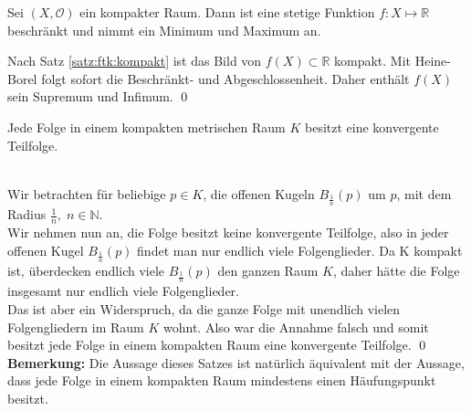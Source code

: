 \begin{Satz}
	Sei \((X, \mathcal{O})\) ein kompakter Raum. Dann ist eine stetige Funktion \(f: X \mapsto \mathbb{R}\) 
	beschränkt und nimmt ein Minimum und Maximum an.
\end{Satz}
%
	Nach Satz \ref{satz:ftk:kompakt} ist das Bild von \( f(X) \subset \mathbb{R} \) kompakt. Mit Heine-Borel 
	folgt sofort die Beschränkt- und Abgeschlossenheit. Daher enthält \(f(X)\) sein Supremum und Infimum.
\qed
	\begin{Satz}
		Jede Folge in einem kompakten metrischen Raum \(K\) besitzt eine konvergente Teilfolge.
	\end{Satz}
	\\
		Wir betrachten für beliebige \( p \in K \), die offenen Kugeln \( B_{\frac{1}{n}}(p) \) um \(p \), mit dem Radius \( \frac{1}{n},\; n \in \mathbb{N}\). \\
		Wir nehmen nun an, die Folge besitzt keine konvergente Teilfolge, also in jeder offenen Kugel \( B_{\frac{1}{n}}(p) \) findet man nur endlich viele Folgenglieder. 
		Da K kompakt ist, überdecken endlich viele  \( B_{\frac{1}{n}}(p) \) den ganzen Raum \( K \), daher hätte die Folge insgesamt nur endlich viele Folgenglieder.\\
		Das ist aber ein Widerspruch, da die ganze Folge mit unendlich vielen Folgengliedern im Raum \(K \) wohnt. Also war die Annahme falsch und somit besitzt jede Folge in einem kompakten
		Raum eine konvergente Teilfolge.
	\qed\\
	{\bf Bemerkung:} Die Aussage dieses Satzes ist natürlich äquivalent mit der Aussage, dass jede Folge in einem kompakten Raum mindestens einen Häufungspunkt besitzt. 
	

